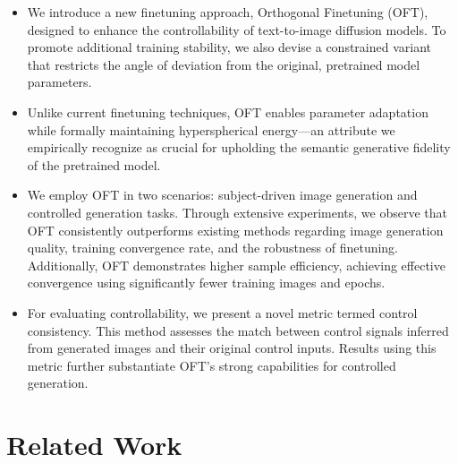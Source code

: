 \begin{itemize}[leftmargin=*,nosep]

    \item We introduce a new finetuning approach, Orthogonal Finetuning (OFT), designed to enhance the controllability of text-to-image diffusion models. To promote additional training stability, we also devise a constrained variant that restricts the angle of deviation from the original, pretrained model parameters.
    \item Unlike current finetuning techniques, OFT enables parameter adaptation while formally maintaining hyperspherical energy—an attribute we empirically recognize as crucial for upholding the semantic generative fidelity of the pretrained model.
    \item We employ OFT in two scenarios: subject-driven image generation and controlled generation tasks. Through extensive experiments, we observe that OFT consistently outperforms existing methods regarding image generation quality, training convergence rate, and the robustness of finetuning. Additionally, OFT demonstrates higher sample efficiency, achieving effective convergence using significantly fewer training images and epochs.
    \item For evaluating controllability, we present a novel metric termed control consistency. This method assesses the match between control signals inferred from generated images and their original control inputs. Results using this metric further substantiate OFT’s strong capabilities for controlled generation.
\end{itemize}

\section{Related Work}

